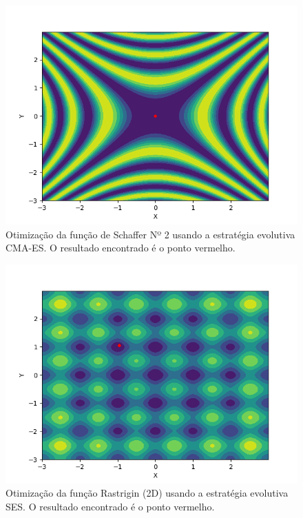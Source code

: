 \documentclass[conference]{IEEEtran}
\begin{document}
\begin{figure}[htbp]
\centering
\centerline{\includegraphics[scale=0.5]{imagens/schaffer2d/cmaes.png}}
\caption{Otimização da função de Schaffer Nº 2 usando a estratégia evolutiva CMA-ES. O resultado encontrado é o ponto vermelho.}
\label{schaffer2d/cmaes}
\end{figure}

\begin{figure}[htbp]
\centering
\centerline{\includegraphics[scale=0.5]{imagens/rastrigin/ses.png}}
\caption{Otimização da função Rastrigin (2D) usando a estratégia evolutiva SES. O resultado encontrado é o ponto vermelho.}
\label{rastrigin/ses}
\end{figure} 
\end{document}
